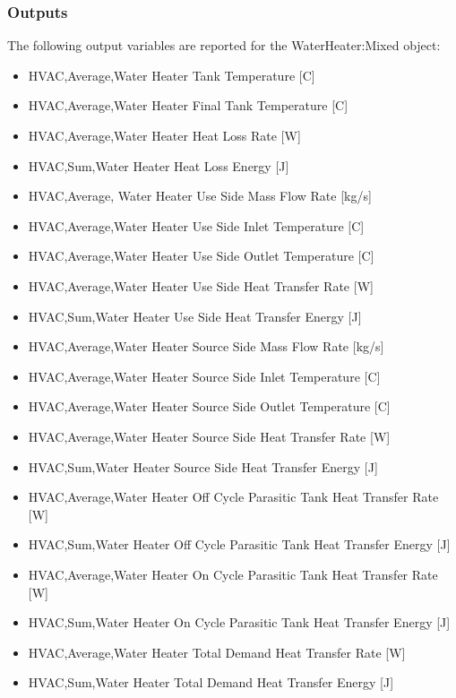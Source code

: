\subsubsection{Outputs}\label{outputs-040}

The following output variables are reported for the WaterHeater:Mixed object:

\begin{itemize}
\item
  HVAC,Average,Water Heater Tank Temperature {[}C{]}
\item
  HVAC,Average,Water Heater Final Tank Temperature {[}C{]}
\item
  HVAC,Average,Water Heater Heat Loss Rate {[}W{]}
\item
  HVAC,Sum,Water Heater Heat Loss Energy {[}J{]}
\item
  HVAC,Average, Water Heater Use Side Mass Flow Rate {[}kg/s{]}
\item
  HVAC,Average,Water Heater Use Side Inlet Temperature {[}C{]}
\item
  HVAC,Average,Water Heater Use Side Outlet Temperature {[}C{]}
\item
  HVAC,Average,Water Heater Use Side Heat Transfer Rate {[}W{]}
\item
  HVAC,Sum,Water Heater Use Side Heat Transfer Energy {[}J{]}
\item
  HVAC,Average,Water Heater Source Side Mass Flow Rate {[}kg/s{]}
\item
  HVAC,Average,Water Heater Source Side Inlet Temperature {[}C{]}
\item
  HVAC,Average,Water Heater Source Side Outlet Temperature {[}C{]}
\item
  HVAC,Average,Water Heater Source Side Heat Transfer Rate {[}W{]}
\item
  HVAC,Sum,Water Heater Source Side Heat Transfer Energy {[}J{]}
\item
  HVAC,Average,Water Heater Off Cycle Parasitic Tank Heat Transfer Rate {[}W{]}
\item
  HVAC,Sum,Water Heater Off Cycle Parasitic Tank Heat Transfer Energy {[}J{]}
\item
  HVAC,Average,Water Heater On Cycle Parasitic Tank Heat Transfer Rate {[}W{]}
\item
  HVAC,Sum,Water Heater On Cycle Parasitic Tank Heat Transfer Energy {[}J{]}
\item
  HVAC,Average,Water Heater Total Demand Heat Transfer Rate {[}W{]}
\item
  HVAC,Sum,Water Heater Total Demand Heat Transfer Energy {[}J{]}

\end{itemize}
